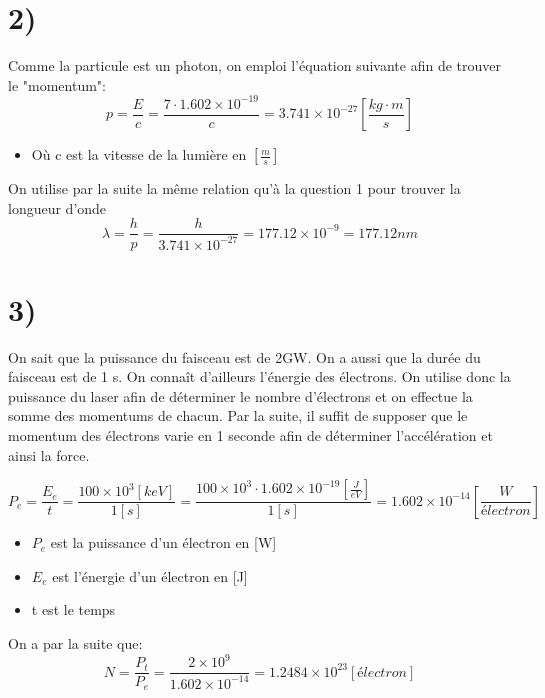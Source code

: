 \section{2)}
Comme la particule est un photon, on emploi l'équation suivante afin de trouver le "momentum":
\begin{equation}
p = \frac{E}{c} = \frac{7 \cdot 1.602\times 10^{-19}}{c} = 3.741\times 10^{-27} \left[\frac{kg \cdot m}{s}\right]
\end{equation}
\begin{itemize}
\item Où c est la vitesse de la lumière en $\left[\frac{m}{s}\right]$
\end{itemize}

On utilise par la suite la même relation qu'à la question 1 pour trouver la longueur d'onde
\begin{equation}
\lambda = \frac{h}{p} = \frac{h}{3.741\times 10^{-27}} = 177.12\times 10^{-9} = 177.12nm
\end{equation}
\section{3)}
On sait que la puissance du faisceau est de 2GW. On a aussi que la durée du faisceau est de 1 s. On connaît d'ailleurs l'énergie des électrons. On utilise donc la puissance du laser afin de déterminer le nombre d'électrons et on effectue la somme des momentums de chacun. Par la suite, il suffit de supposer que le momentum des électrons varie en 1 seconde afin de déterminer l'accélération et ainsi la force.

\begin{equation}
P_{e} = \frac{E_{e}}{t} = \frac{100 \times 10^3 \left[keV\right]}{1 \left[s\right]} = \frac{100 \times 10^3 \cdot 1.602\times 10^{-19} \left[\frac{J}{eV}\right]}{1 \left[s\right]} = 1.602\times 10^{-14}\left[\frac{W}{électron}\right]
\end{equation}
\begin{itemize}
\item $P_{e}$ est la puissance d'un électron en [W]
\item $E_{e}$ est l'énergie d'un électron en [J]
\item t est le temps
\end{itemize}
On a par la suite que:
\begin{equation}
N = \frac{P_t}{P_e} = \frac{2 \times 10^{9}}{1.602\times 10^{-14}} = 1.2484\times 10^{23}\left[électron\right]
\end{equation}

